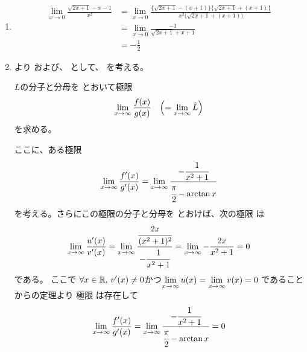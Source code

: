 \begin{ans*}
  ${}$
  \begin{enumerate}[label=(\arabic*)]
    \item
    \begin{align}
      \lim_{x\to 0}\frac{\sqrt{2x+1} - x - 1}{x^2}
      &= \lim_{x\to 0}\frac{\bigl\{ \sqrt{2x+1} - (x+1) \bigr\}\bigl\{ \sqrt{2x+1} + (x+1) \bigr\}}{x^2\bigl( \sqrt{2x+1} + (x+1) \bigr)} \\
      &= \lim_{x\to 0}\frac{-1}{\sqrt{2x+1} + x + 1} \\
      &= - \frac{1}{2}
    \end{align}

    \item
    より
    および、
    として、
    を考える。

    $L$の分子と分母を
    とおいて極限
    \begin{gather}
      \lim_{x\to\infty}\frac{f(x)}{g(x)} \quad\Bigl(= \lim_{x\to\infty} \hat{L}\Bigr)
    \end{gather}
    を求める。

    ここに、ある極限
    \begin{gather}
      \lim_{x\to\infty}\frac{f'(x)}{g'(x)}
      =\lim_{x\to\infty}\frac{-\cfrac{1}{x^2+1}}{\cfrac{\pi}{2}-\arctan x}
    \end{gather}
    を考える。さらにこの極限の分子と分母を
    とおけば、次の極限
    は
    \begin{align}
      \lim_{x\to\infty}\frac{u'(x)}{v'(x)}
      = \lim_{x\to\infty} \frac{\cfrac{2x}{(x^2+1)^2}}{-\cfrac{1}{x^2+1}}
      = \lim_{x\to\infty} -\frac{2x}{x^2+1}
      = 0
    \end{align}
    である。
    ここで
    $\displaystyle\forall x\in\mathbb{R},\,\displaystyle v'(x)\neq 0$かつ$\displaystyle \lim_{x\to\infty}u(x) = \lim_{x\to\infty}v(x) = 0$
    であることから\lhopital の定理より
    極限
    は存在して
    \begin{gather}
      \lim_{x\to\infty}\frac{f'(x)}{g'(x)}
      = \lim_{x\to\infty}\frac{-\cfrac{1}{x^2+1}}{\cfrac{\pi}{2}-\arctan x}
      = 0
    \end{gather}


\end{enumerate}
\end{ans*}
